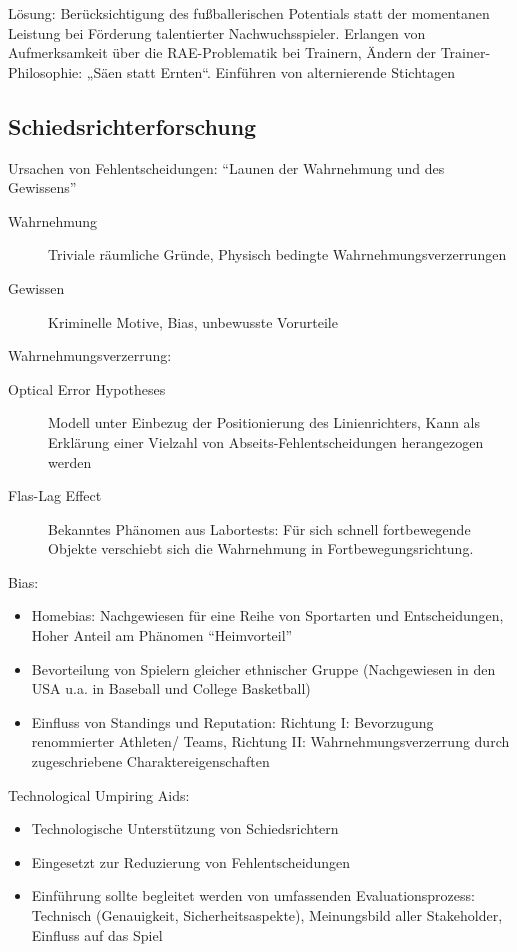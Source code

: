 Lösung: Berücksichtigung des fußballerischen Potentials statt der momentanen
Leistung bei Förderung talentierter Nachwuchsspieler. Erlangen von Aufmerksamkeit über die RAE-Problematik bei Trainern, Ändern der Trainer- Philosophie: „Säen statt Ernten“. Einführen von alternierende Stichtagen

\subsection{Schiedsrichterforschung}

Ursachen von Fehlentscheidungen: ``Launen der Wahrnehmung und des Gewissens''
\begin{description}
    \item [Wahrnehmung] Triviale räumliche Gründe, Physisch bedingte Wahrnehmungsverzerrungen
    \item [Gewissen] Kriminelle Motive, Bias, unbewusste Vorurteile
\end{description}

Wahrnehmungsverzerrung:
\begin{description}
    \item[Optical Error Hypotheses] Modell unter Einbezug der Positionierung des Linienrichters, Kann als Erklärung einer Vielzahl von Abseits-Fehlentscheidungen herangezogen werden
    \item [Flas-Lag Effect] Bekanntes Phänomen aus Labortests: Für sich schnell fortbewegende Objekte verschiebt sich die Wahrnehmung in Fortbewegungsrichtung.
\end{description}

Bias:
\begin{itemize}
     \item Homebias: Nachgewiesen für eine Reihe von Sportarten und Entscheidungen, Hoher Anteil am Phänomen ``Heimvorteil''
     \item Bevorteilung von Spielern gleicher ethnischer Gruppe (Nachgewiesen in den USA u.a. in Baseball und College Basketball)
     \item Einfluss von Standings und Reputation: Richtung I: Bevorzugung renommierter Athleten/ Teams, Richtung II: Wahrnehmungsverzerrung durch zugeschriebene Charaktereigenschaften
 \end{itemize}

Technological Umpiring Aids:
\begin{itemize}
    \item Technologische Unterstützung von Schiedsrichtern
    \item Eingesetzt zur Reduzierung von Fehlentscheidungen
    \item Einführung sollte begleitet werden von umfassenden Evaluationsprozess: Technisch (Genauigkeit, Sicherheitsaspekte), Meinungsbild aller Stakeholder, Einfluss auf das Spiel
\end{itemize}

